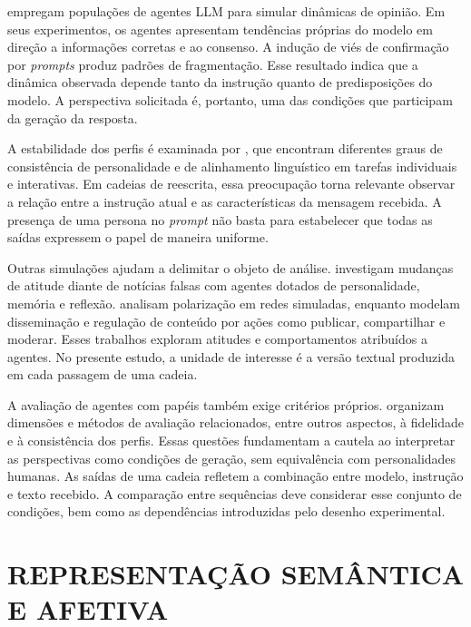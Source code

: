  empregam populações de agentes LLM para simular dinâmicas de opinião. Em seus experimentos, os agentes apresentam tendências próprias do modelo em direção a informações corretas e ao consenso. A indução de viés de confirmação por \textit{prompts} produz padrões de fragmentação. Esse resultado indica que a dinâmica observada depende tanto da instrução quanto de predisposições do modelo. A perspectiva solicitada é, portanto, uma das condições que participam da geração da resposta.

A estabilidade dos perfis é examinada por , que encontram diferentes graus de consistência de personalidade e de alinhamento linguístico em tarefas individuais e interativas. Em cadeias de reescrita, essa preocupação torna relevante observar a relação entre a instrução atual e as características da mensagem recebida. A presença de uma persona no \textit{prompt} não basta para estabelecer que todas as saídas expressem o papel de maneira uniforme.

Outras simulações ajudam a delimitar o objeto de análise.  investigam mudanças de atitude diante de notícias falsas com agentes dotados de personalidade, memória e reflexão.  analisam polarização em redes simuladas, enquanto  modelam disseminação e regulação de conteúdo por ações como publicar, compartilhar e moderar. Esses trabalhos exploram atitudes e comportamentos atribuídos a agentes. No presente estudo, a unidade de interesse é a versão textual produzida em cada passagem de uma cadeia.

A avaliação de agentes com papéis também exige critérios próprios.  organizam dimensões e métodos de avaliação relacionados, entre outros aspectos, à fidelidade e à consistência dos perfis. Essas questões fundamentam a cautela ao interpretar as perspectivas como condições de geração, sem equivalência com personalidades humanas. As saídas de uma cadeia refletem a combinação entre modelo, instrução e texto recebido. A comparação entre sequências deve considerar esse conjunto de condições, bem como as dependências introduzidas pelo desenho experimental.

\section{REPRESENTAÇÃO SEMÂNTICA E AFETIVA}
\label{sec:representacao-afetiva}

